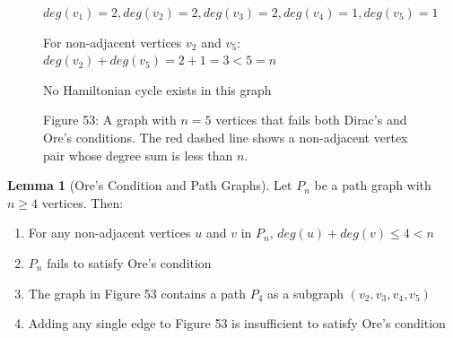 \documentclass{article}
\theoremstyle{definition}
\def\deg{deg}%
\newtheorem{lemma}{Lemma}
\begin{document}
\begin{figure}[h!]
\begin{center}
\end{center}

\vspace{0.5cm}
{\centering
\small $\deg(v_1) = 2, \deg(v_2) = 2, \deg(v_3) = 2, \deg(v_4) = 1, \deg(v_5) = 1$
\par}

\vspace{0.3cm}
{\centering
\small For non-adjacent vertices $v_2$ and $v_5$: $\deg(v_2) + \deg(v_5) = 2 + 1 = 3 < 5 = n$
\par}

\vspace{0.3cm}
{\centering
\small No Hamiltonian cycle exists in this graph
\par}

\begin{center}
\small Figure 53: A graph with $n = 5$ vertices that fails both Dirac's and Ore's conditions. The red dashed line shows a non-adjacent vertex pair whose degree sum is less than $n$.
\end{center}
\end{figure}
\begin{lemma}[Ore's Condition and Path Graphs]
Let $P_n$ be a path graph with $n \geq 4$ vertices. Then:
\begin{enumerate}
    \item For any non-adjacent vertices $u$ and $v$ in $P_n$, $\deg(u) + \deg(v) \leq 4 < n$
    \item $P_n$ fails to satisfy Ore's condition
    \item The graph in Figure 53 contains a path $P_4$ as a subgraph $(v_2, v_3, v_4, v_5)$
    \item Adding any single edge to Figure 53 is insufficient to satisfy Ore's condition
\end{enumerate}
\end{lemma}
\end{document}
